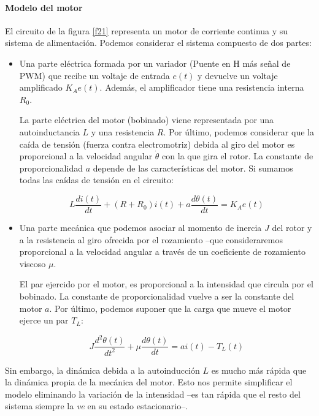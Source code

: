 \documentclass[10pt,a4paper]{report}
\begin{document}
\paragraph{Modelo del motor} El circuito de la figura \ref{f21} representa un motor de corriente continua y su sistema de alimentación. Podemos considerar el sistema compuesto de dos partes:

\begin{itemize}
	\item Una parte eléctrica formada por un variador (Puente en H más señal de PWM)  que recibe un voltaje de entrada $e(t)$ y devuelve un voltaje amplificado $K_Ae(t)$. Además, el amplificador tiene una resistencia interna $R_0$.

 La parte eléctrica del motor (bobinado) viene representada por una autoinductancia $L$ y una resistencia $R$. Por último, podemos considerar que la caída de tensión (fuerza contra electromotriz) debida al giro del motor es proporcional a la velocidad angular $\dot{\theta}$ con la que gira el rotor.  La constante de proporcionalidad $a$ depende de las características del motor. Si sumamos todas las caídas de tensión en el circuito:


\begin{equation}\label{elc}
L\frac{di(t)}{dt}+(R+R_0)i(t)+a\frac{d\theta(t)}{dt} = K_Ae(t)
\end{equation}

\item Una parte mecánica que podemos asociar al momento de inercia $J$ del rotor y  a la resistencia al giro ofrecida por el rozamiento --que consideraremos proporcional a la velocidad angular a través de un coeficiente de rozamiento viscoso $\mu$. 

El par ejercido por el motor, es proporcional a la intensidad que circula por el bobinado. La constante de proporcionalidad vuelve a ser la constante del motor $a$. Por último, podemos suponer que la carga que mueve el motor ejerce un par $T_L$:

\begin{equation}\label{mec}
J\frac{d^2\theta(t)}{dt^2}+\mu\frac{d\theta(t)}{dt} = ai(t)-T_L(t)
\end{equation}
\end{itemize}
Sin embargo, la dinámica debida a la autoinducción $L$ es mucho más rápida que la dinámica propia de la mecánica del motor.  Esto nos permite simplificar el modelo eliminando la variación de la intensidad --es tan rápida que el resto del sistema siempre la \emph{ve} en su estado estacionario--.
\end{document}
